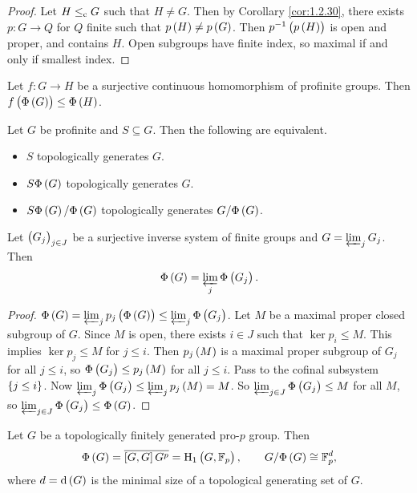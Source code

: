 \begin{proof}
Let $ H \le_{\mathrm{c}} G $ such that $ H \ne G $. Then by Corollary \ref{cor:1.2.30}, there exists $ p : G \to Q $ for $ Q $ finite such that $ p\br{H} \ne p\br{G} $. Then $ p^{-1}\br{p\br{H}} $ is open and proper, and contains $ H $. Open subgroups have finite index, so maximal if and only if smallest index.
\end{proof}

\begin{proposition}
Let $ f : G \to H $ be a surjective continuous homomorphism of profinite groups. Then $ f\br{\Phi\br{G}} \le \Phi\br{H} $.
\end{proposition}

\begin{proposition}
Let $ G $ be profinite and $ S \subseteq G $. Then the following are equivalent.
\begin{itemize}
\item $ S $ topologically generates $ G $.
\item $ S\Phi\br{G} $ topologically generates $ G $.
\item $ S\Phi\br{G} / \Phi\br{G} $ topologically generates $ G / \Phi\br{G} $.
\end{itemize}
\end{proposition}

\begin{proposition}
Let $ \br{G_j}_{j \in J} $ be a surjective inverse system of finite groups and $ G = \varprojlim_j G_j $. Then
$$ \Phi\br{G} = \varprojlim_j \Phi\br{G_j}. $$
\end{proposition}

\begin{proof}
$ \Phi\br{G} = \varprojlim_j p_j\br{\Phi\br{G}} \le \varprojlim_j \Phi\br{G_j} $. Let $ M $ be a maximal proper closed subgroup of $ G $. Since $ M $ is open, there exists $ i \in J $ such that $ \ker p_i \le M $. This implies $ \ker p_j \le M $ for $ j \le i $. Then $ p_j\br{M} $ is a maximal proper subgroup of $ G_j $ for all $ j \le i $, so $ \Phi\br{G_j} \le p_j\br{M} $ for all $ j \le i $. Pass to the cofinal subsystem $ \cbr{j \le i} $. Now $ \varprojlim_j \Phi\br{G_j} \le \varprojlim_j p_j\br{M} = M $. So $ \varprojlim_{j \in J} \Phi\br{G_j} \le M $ for all $ M $, so $ \varprojlim_{j \in J} \Phi\br{G_j} \le \Phi\br{G} $.
\end{proof}

\begin{proposition}
Let $ G $ be a topologically finitely generated pro-$ p $ group. Then
$$ \Phi\br{G} = \overline{\sbr{G, G}G^p} = \H_1\br{G, \FF_p}, \qquad G / \Phi\br{G} \cong \FF_p^d, $$
where $ d = \d\br{G} $ is the minimal size of a topological generating set of $ G $.
\end{proposition}

